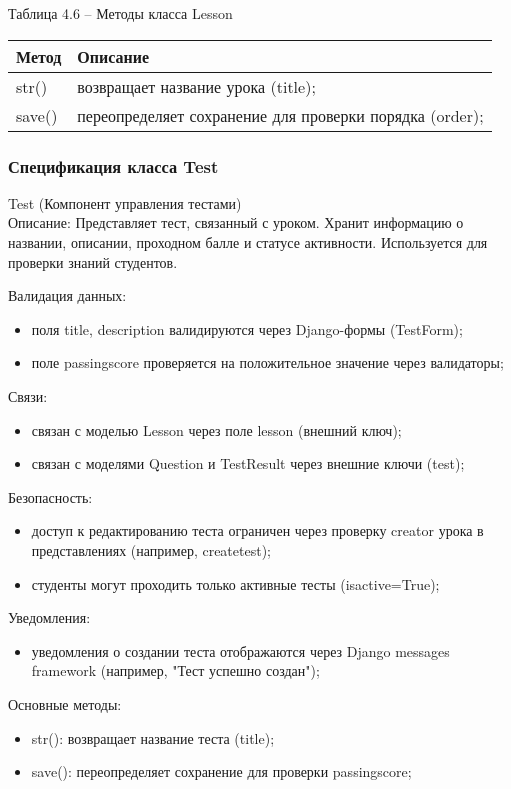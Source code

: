 Таблица 4.6 – Методы класса Lesson \\
\begin{tabular}{|p{4cm}|p{8cm}|}
	\hline
	Метод & Описание \\
	\hline
	str() & возвращает название урока (title); \\
	save() & переопределяет сохранение для проверки порядка (order); \\
	\hline
\end{tabular}

\subsubsection{Спецификация класса Test}
Test (Компонент управления тестами) \\
Описание: Представляет тест, связанный с уроком. Хранит информацию о названии, описании, проходном балле и статусе активности. Используется для проверки знаний студентов.

Валидация данных: 
\begin{itemize}
	\item поля title, description валидируются через Django-формы (TestForm); 
	\item поле passingscore проверяется на положительное значение через валидаторы;
\end{itemize}

Связи: 
\begin{itemize}
	\item связан с моделью Lesson через поле lesson (внешний ключ); 
	\item связан с моделями Question и TestResult через внешние ключи (test); 
\end{itemize}

Безопасность: 
\begin{itemize}
	\item доступ к редактированию теста ограничен через проверку creator урока в представлениях (например, createtest); 
	\item студенты могут проходить только активные тесты (isactive=True); 
\end{itemize}

Уведомления: 
\begin{itemize}
	\item уведомления о создании теста отображаются через Django messages framework (например, "Тест успешно создан"); 
\end{itemize}

Основные методы: 
\begin{itemize}
	\item str(): возвращает название теста (title); 
	\item save(): переопределяет сохранение для проверки passingscore; 
\end{itemize}

